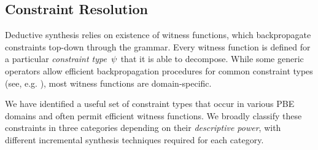 \subsection{Constraint Resolution}
Deductive synthesis relies on existence of witness functions, which backpropagate constraints top-down through the
grammar.
Every witness function is defined for a particular \emph{constraint type}~$\psi$ that it is able to decompose.
While some generic operators allow efficient backpropagation procedures for common constraint types (see, e.g.
\cite{pldi15:swarat,flashextract}), most witness functions are domain-specific.

We have identified a useful set of constraint types that occur in various PBE domains and often permit efficient witness
functions.
We broadly classify these constraints in three categories depending on their \emph{descriptive power}, with different
incremental synthesis techniques required for each category.
